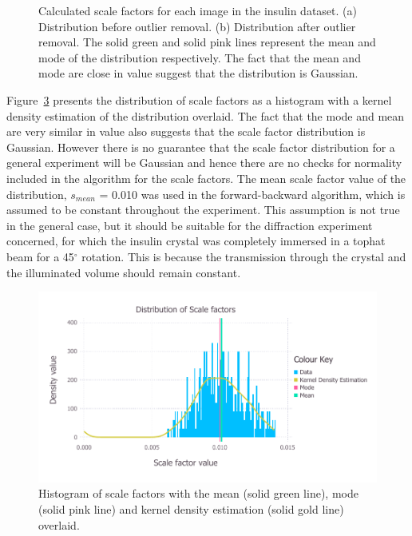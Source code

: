 \begin{figure}
\begin{subfigure}[b]{1.0\textwidth}
            \caption{}
            \label{fig:Scale factors per image after outlier removal - insulin}
    \end{subfigure}
    \caption[Calculated scale factors for each image in the insulin dataset.]{Calculated scale factors for each image in the insulin dataset.
    (a) Distribution before outlier removal.
    (b) Distribution after outlier removal.
    The solid green and solid pink lines represent the mean and mode of the distribution respectively.
    The fact that the mean and mode are close in value suggest that the distribution is Gaussian.}
    \label{fig:Scale factors per image - insulin}
\end{figure}

Figure~\ref{fig:Scale factor distribution after outlier removal - insulin} presents the distribution of scale factors as a histogram with a kernel density estimation of the distribution overlaid.
The fact that the mode and mean are very similar in value also suggests that the scale factor distribution is Gaussian.
However there is no guarantee that the scale factor distribution for a general experiment will be Gaussian and hence there are no checks for normality included in the algorithm for the scale factors.
The mean scale factor value of the distribution, $s_{mean}$ = 0.010 was used in the forward-backward algorithm, which is assumed to be constant throughout the experiment.
This assumption is not true in the general case, but it should be suitable for the diffraction experiment concerned, for which the insulin crystal was completely immersed in a tophat beam for a 45$^{\circ}$ rotation.
This is because the transmission through the crystal and the illuminated volume should remain constant.
\begin{figure}[ht!]
    \centering
    \includegraphics[width=1.0\textwidth]{figures/datared/ScaleFac_Distribution.pdf}
    \caption[Histogram of scale factors for insulin dataset.]{Histogram of scale factors with the mean (solid green line), mode (solid pink line) and kernel density estimation (solid gold line) overlaid.}
    \label{fig:Scale factor distribution after outlier removal - insulin}
\end{figure}

